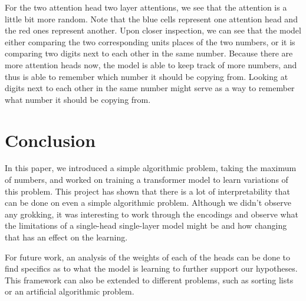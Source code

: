 \documentclass{article}
\begin{document}
For the two attention head two layer attentions, we see that the attention is a little bit more random. Note that the blue cells represent one attention head and the red ones represent another. Upon closer inspection, we can see that the model either comparing the two corresponding units places of the two numbers, or it is comparing two digits next to each other in the same number. Because there are more attention heads now, the model is able to keep track of more numbers, and thus is able to remember which number it should be copying from. Looking at digits next to each other in the same number might serve as a way to remember what number it should be copying from.

\section{Conclusion} 

In this paper, we introduced a simple algorithmic problem, taking the maximum of numbers, and worked on training a transformer model to learn variations of this problem. This project has shown that there is a lot of interpretability that can be done on even a simple algorithmic problem. Although we didn't observe any grokking, it was interesting to work through the encodings and observe what the limitations of a single-head single-layer model might be and how changing that has an effect on the learning.

For future work, an analysis of the weights of each of the heads can be done to find specifics as to what the model is learning to further support our hypotheses. This framework can also be extended to different problems, such as sorting lists or an artificial algorithmic problem.

\newpage


\end{document}
